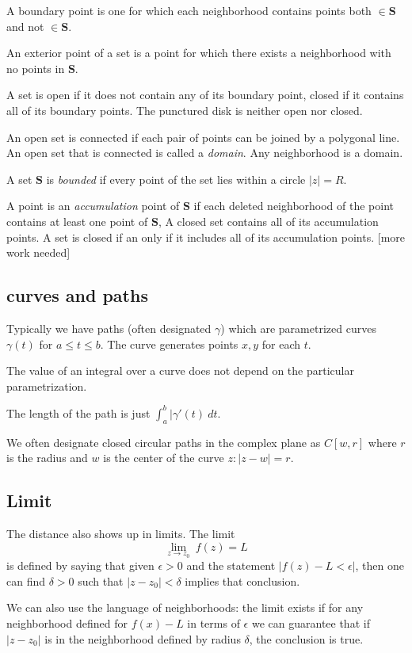 \documentclass[11pt, oneside]{article}
\begin{document}
A boundary point is one for which each neighborhood contains points both $\in \mathbf{S}$ and not $\in \mathbf{S}$.

An exterior point of a set is a point for which there exists a neighborhood with no points in $\mathbf{S}$.

A set is open if it does not contain any of its boundary point, closed if it contains all of its boundary points.  The punctured disk is neither open nor closed.

An open set is connected if each pair of points can be joined by a polygonal line.  An open set that is connected is called a \emph{domain}.  Any neighborhood is a domain.

A set $\mathbf{S}$ is \emph{bounded} if every point of the set lies within a circle $|z| = R$.

A point is an \emph{accumulation} point of $\mathbf{S}$ if each deleted neighborhood of the point contains at least one point of $\mathbf{S}$,  A closed set contains all of its accumulation points.  A set is closed if an only if it includes all of its accumulation points.  [more work needed]

\subsection*{curves and paths}
Typically we have paths (often designated $\gamma$) which are parametrized curves $\gamma(t)$ for $a \le t \le b$.  The curve generates points $x,y$ for each $t$.

The value of an integral over a curve does not depend on the particular parametrization.

The length of the path is just $\int_a^b |\gamma'(t) \ dt$.

We often designate closed circular paths in the complex plane as $C[w,r]$ where  $r$ is the radius and $w$ is the center of the curve $z: |z - w| = r$.

\subsection*{Limit}
The distance also shows up in limits.  The limit
\[ \lim_{z \rightarrow z_0} \ f(z) = L \]
is defined by saying that given $\epsilon > 0$ and the statement $|f(z) - L < \epsilon|$, then one can find $\delta > 0$ such that $|z - z_0| < \delta$ implies that conclusion.

We can also use the language of neighborhoods:  the limit exists if for any neighborhood defined for $f(x) - L$ in terms of $\epsilon$ we can guarantee that if $|z-z_0|$ is in the neighborhood defined by radius $\delta$, the conclusion is true.
\end{document}
